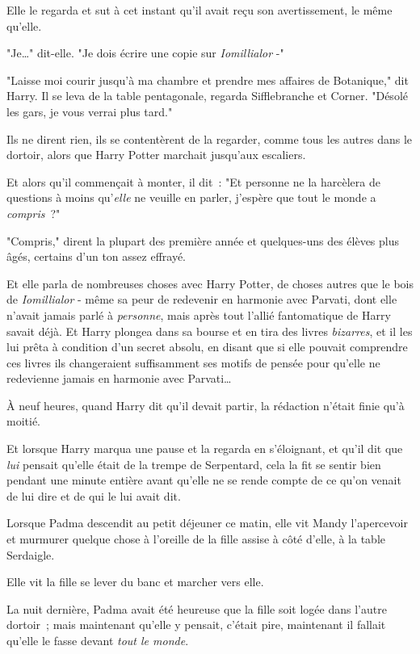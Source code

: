 Elle le regarda et sut à cet instant qu'il avait reçu son avertissement, le même qu'elle.

"Je…" dit-elle. "Je dois écrire une copie sur \emph{Iomillialor} -"

"Laisse moi courir jusqu'à ma chambre et prendre mes affaires de Botanique," dit Harry. Il se leva de la table pentagonale, regarda Sifflebranche et Corner. "Désolé les gars, je vous verrai plus tard."

Ils ne dirent rien, ils se contentèrent de la regarder, comme tous les autres dans le dortoir, alors que Harry Potter marchait jusqu'aux escaliers.

Et alors qu'il commençait à monter, il dit~: "Et personne ne la harcèlera de questions à moins qu'\emph{elle} ne veuille en parler, j'espère que tout le monde a \emph{compris}~?"

"Compris," dirent la plupart des première année et quelques-uns des élèves plus âgés, certains d'un ton assez effrayé.

\later

Et elle parla de nombreuses choses avec Harry Potter, de choses autres que le bois de \emph{Iomillialor} - même sa peur de redevenir en harmonie avec Parvati, dont elle n'avait jamais parlé à \emph{personne}, mais après tout l'allié fantomatique de Harry savait déjà. Et Harry plongea dans sa bourse et en tira des livres \emph{bizarres}, et il les lui prêta à condition d'un secret absolu, en disant que si elle pouvait comprendre ces livres ils changeraient suffisamment ses motifs de pensée pour qu'elle ne redevienne jamais en harmonie avec Parvati…

À neuf heures, quand Harry dit qu'il devait partir, la rédaction n'était finie qu'à moitié.

Et lorsque Harry marqua une pause et la regarda en s'éloignant, et qu'il dit que \emph{lui} pensait qu'elle était de la trempe de Serpentard, cela la fit se sentir bien pendant une minute entière avant qu'elle ne se rende compte de ce qu'on venait de lui dire et de qui le lui avait dit.

\later

Lorsque Padma descendit au petit déjeuner ce matin, elle vit Mandy l'apercevoir et murmurer quelque chose à l'oreille de la fille assise à côté d'elle, à la table Serdaigle.

Elle vit la fille se lever du banc et marcher vers elle.

La nuit dernière, Padma avait été heureuse que la fille soit logée dans l'autre dortoir~; mais maintenant qu'elle y pensait, c'était pire, maintenant il fallait qu'elle le fasse devant \emph{tout le monde}.

